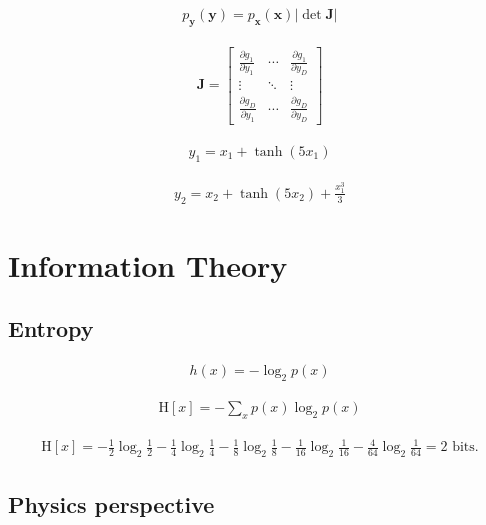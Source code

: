 \documentclass{article}
\begin{document}
\begin{align*}
p_{\mathbf{y}}(\mathbf{y}) = p_{\mathbf{x}}(\mathbf{x}) \left| \operatorname{det} \mathbf{J} \right|
\tag{2.76}
\end{align*}

\begin{align*}
\mathbf{J} = \left[
\begin{array}{ccc}
\frac{\partial g_{1}}{\partial y_{1}} & \cdots & \frac{\partial g_{1}}{\partial y_{D}} \\
\vdots & \ddots & \vdots \\
\frac{\partial g_{D}}{\partial y_{1}} & \cdots & \frac{\partial g_{D}}{\partial y_{D}}
\end{array}
\right]
\tag{2.77}
\end{align*}

\begin{align*}
y_{1} = x_{1} + \tanh \left(5 x_{1}\right)
\tag{2.78}
\end{align*}

\begin{align*}
y_{2} = x_{2} + \tanh \left(5 x_{2}\right) + \frac{x_{1}^{3}}{3}
\tag{2.79}
\end{align*}


\section{Information Theory}

\subsection{Entropy}

\begin{align*}
h(x) = -\log_2 p(x) 
\tag{2.80}
\end{align*}

\begin{align*}
\mathrm{H}[x] = -\sum_{x} p(x) \log_2 p(x) 
\tag{2.81}
\end{align*}

\begin{align*}
\mathrm{H}[x] = -\frac{1}{2} \log_2 \frac{1}{2} - \frac{1}{4} \log_2 \frac{1}{4} - \frac{1}{8} \log_2 \frac{1}{8} - \frac{1}{16} \log_2 \frac{1}{16} - \frac{4}{64} \log_2 \frac{1}{64} = 2 \text{ bits.}
\end{align*}

\subsection{Physics perspective}
\end{document}
